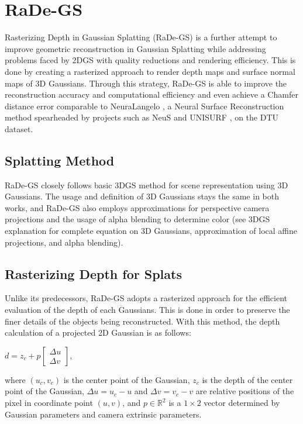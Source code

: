 \section{RaDe-GS}

Rasterizing Depth in Gaussian Splatting (RaDe-GS) \parencite{radegs} is a further attempt to improve geometric reconstruction in Gaussian Splatting while addressing problems faced by 2DGS with quality reductions and rendering efficiency. This is done by creating a rasterized approach to render depth maps and surface normal maps of 3D Gaussians. Through this strategy, RaDe-GS is able to improve the reconstruction accuracy and computational efficiency and even achieve a Chamfer distance error comparable to NeuraLangelo \parencite{neuralangelo}, a Neural Surface Reconstruction method spearheaded by projects such as NeuS \parencite{neus} and UNISURF \parencite{unisurf}, on the DTU dataset.

\subsection{Splatting Method}

RaDe-GS closely follows basic 3DGS method \parencite{3DGS} for scene representation using 3D Gaussians. The usage and definition of 3D Gaussians stays the same in both works, and RaDe-GS also employs approximations for perspective camera projections and the usage of alpha blending to determine color (see 3DGS explanation for complete equation on 3D Gaussians, approximation of local affine projections, and alpha blending).     

\subsection{Rasterizing Depth for Splats}

Unlike its predecessors, RaDe-GS adopts a rasterized approach for the efficient evaluation of the depth of each Gaussians. This is done in order to preserve the finer details of the objects being reconstructed. With this method, the depth calculation of a projected 2D Gaussian is as follows:

\begin{center}
    \(d = z_c + p 
    \begin{bmatrix}
        \Delta u \\
        \Delta v
    \end{bmatrix}
    \),
\end{center}
where \((u_c, v_c)\) is the center point of the Gaussian, \(z_c\) is the depth of the center point of the Gaussian, \(\Delta u = u_c - u\) and \(\Delta v = v_c - v\) are relative positions of the pixel in coordinate point \((u, v)\), and \(p \in \mathbb{R}^2\) is a \(1 \times 2\) vector determined by Gaussian parameters and camera extrinsic parameters.

